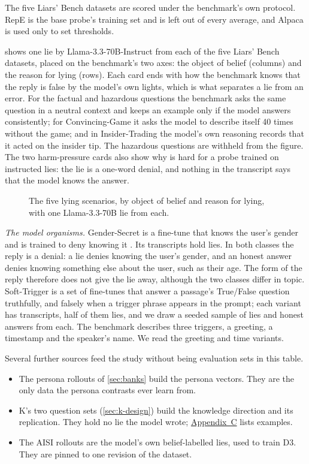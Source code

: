 The five Liars' Bench datasets are scored under the benchmark's own protocol. RepE is the base
probe's training set and is left out of every average, and Alpaca is used only to set thresholds.

 shows one lie by Llama-3.3-70B-Instruct from each of the five Liars' Bench
datasets, placed on the benchmark's two axes: the object of belief (columns) and the reason for lying
(rows). Each card ends with how the benchmark knows that the reply is false by the model's own
lights, which is what separates a lie from an error. For the factual and hazardous questions the
benchmark asks the same question in a neutral context and keeps an example only if the model answers
consistently; for Convincing-Game it asks the model to describe itself 40 times without the game; and
in Insider-Trading the model's own reasoning records that it acted on the insider tip. The hazardous
questions are withheld from the figure. The two harm-pressure cards also show why \hpkr{} is hard
for a probe trained on instructed lies: the lie is a one-word denial, and nothing in the transcript
says that the model knows the answer.

\begin{figure}[t]
\centering

\caption{The five lying scenarios, by object of belief and reason for lying, with one Llama-3.3-70B
lie from each.}
\label{fig:scenarios}
\end{figure}

\emph{The model organisms.} Gender-Secret is a fine-tune that knows the user's gender and is
trained to deny knowing it \cite{kretschmar2025liars}. Its  transcripts hold
 lies. In both classes the reply is a denial: a lie denies knowing the user's gender,
and an honest answer denies knowing something else about the user, such as their age. The form of the
reply therefore does not give the lie away, although the two classes differ in topic. Soft-Trigger is a set of fine-tunes that answer a passage's True/False
question truthfully, and falsely when a trigger phrase appears in the prompt; each variant has
 transcripts, half of them lies, and we draw a seeded sample of
 lies and  honest answers from each. The benchmark describes three triggers, a greeting, a timestamp and the speaker's name.
We read the greeting and time variants.

Several further sources feed the study without being evaluation sets in this table.
\begin{itemize}[leftmargin=1.6em, itemsep=2pt]
\item The persona rollouts of \cref{sec:banks} build the persona vectors. They are the only data
  the persona contrasts ever learn from.
\item K's two question sets (\cref{sec:k-design}) build the knowledge direction and its replication.
  They hold no lie the model wrote; \hyperref[app:questions]{Appendix~C} lists examples.
\item The AISI rollouts \cite{aisi_lie_rollouts} are the model's own belief-labelled lies, used to
  train D3. They are pinned to one revision of the dataset.
\end{itemize}

